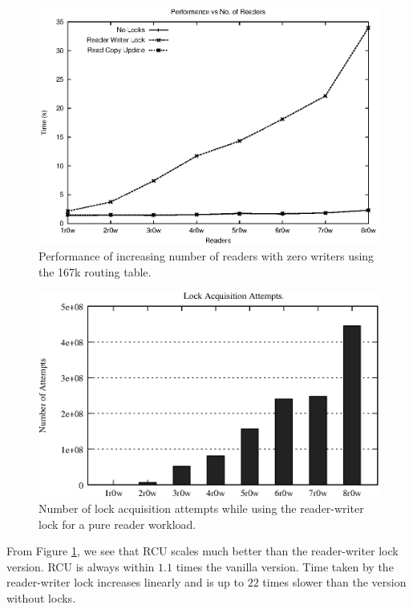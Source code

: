 \documentclass[a4paper,marginparwidth=50pt,marginparsep=10pt]{article}
\begin{document}
\begin{figure}[tph]
\includegraphics[scale = 0.7]{../images/graphs/macro_vr_0w}
\caption{Performance of increasing number of readers with zero writers using the 167k routing table.}
\label{img:macro_vr_0w}
\end{figure}

\begin{figure}[tph]
\includegraphics[scale = 0.7]{../images/graphs/profile_lockcount_macro_rwl_vr_0w}
\caption{Number of lock acquisition attempts while using the reader-writer lock for a pure reader workload.}
\label{img:profile_rwl_locks_vr_0w}
\end{figure}

From Figure \ref{img:macro_vr_0w}, we see that RCU scales much better
than the reader-writer lock version. RCU is always within $1.1$ times
the vanilla version. Time taken by the reader-writer lock increases
linearly and is up to $22$ times slower than the version without
locks.
\end{document}
